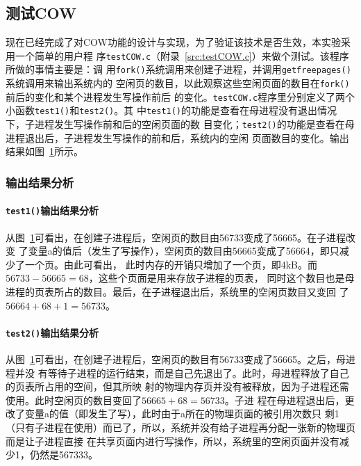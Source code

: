 \documentclass{swfuthesism}
\begin{document}
\subsection{测试COW}

现在已经完成了对COW功能的设计与实现，为了验证该技术是否生效，本实验采用一个简单的用户程
序\texttt{testCOW.c}（附录~\ref{src:testCOW.c}）来做个测试。该程序所做的事情主要是：调
用\texttt{fork()}系统调用来创建子进程，并调用\texttt{getfreepages()}系统调用来输出系统内的
空闲页的数目，以此观察这些空闲页面的数目在\texttt{fork()}前后的变化和某个进程发生写操作前后
的变化。\texttt{testCOW.c}程序里分别定义了两个小函数\texttt{test1()}和\texttt{test2()}。其
中\texttt{test1()}的功能是查看在母进程没有退出情况下，子进程发生写操作前和后的空闲页面的数
目变化；\texttt{test2()}的功能是查看在母进程退出后，子进程发生写操作的前和后，系统内的空闲
页面数目的变化。输出结果如图~\ref{fig:testcow}所示。

\begin{figure}[!ht]
  \centering
  \label{fig:testcow}
\end{figure}

\subsubsection{输出结果分析}

\paragraph{\texttt{test1()}输出结果分析}

从图~\ref{fig:testcow}可看出，在创建子进程后，空闲页的数目由56733变成了56665。在子进程改变
了变量a的值后（发生了写操作），空闲页的数目由56665变成了56664，即只减少了一个页。由此可看出，
此时内存的开销只增加了一个页，即4kB。而$56733-56665=68$，这些个页面是用来存放子进程的页表，
同时这个数目也是母进程的页表所占的数目。最后，在子进程退出后，系统里的空闲页数目又变回
了$56664+68+1=56733$。

\paragraph{\texttt{test2()}输出结果分析}

从图~\ref{fig:testcow}可看出，在创建子进程后，空闲页的数目有56733变成了56665。之后，母进程并没
有等待子进程的运行结束，而是自己先退出了。此时，母进程释放了自己的页表所占用的空间，但其所映
射的物理内存页并没有被释放，因为子进程还需使用。此时空闲页的数目变回了$56665+68=56733$。子进
程在母进程退出后，更改了变量a的值（即发生了写），此时由于a所在的物理页面的被引用次数只
剩1（只有子进程在使用）而已了，所以，系统并没有给子进程再分配一张新的物理页而是让子进程直接
在共享页面内进行写操作，所以，系统里的空闲页面并没有减少1，仍然是567333。
\end{document}
